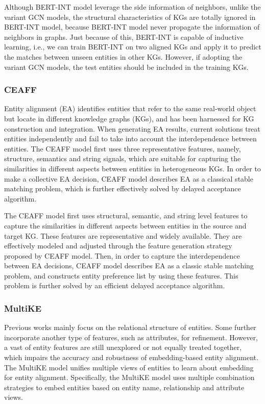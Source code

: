 \documentclass[sigconf]{acmart}
\begin{document}
{Although BERT-INT model leverage the side information of neighbors, unlike the variant GCN models, the structural characteristics of KGs are totally ignored in BERT-INT model, because BERT-INT model never propagate the information of neighbors in graphs. Just because of this, BERT-INT is capable of inductive learning, i.e., we can train BERT-INT on two aligned KGs and apply it to predict the matches between unseen entities in other KGs. However, if adopting the variant GCN models, the test entities should be included in the training KGs.

\subsubsection{CEAFF \cite{zeng2020collective}}

Entity alignment (EA) identifies entities that refer to the same real-world object but locate in different knowledge graphs (KGs), and has been harnessed for KG construction and integration. When generating EA results, current solutions treat entities independently and fail to take into account the interdependence between entities. The CEAFF model first uses three representative features, namely, structure, semantics and string signals, which are suitable for capturing the similarities in different aspects between entities in heterogeneous KGs. In order to make a collective EA decision, CEAFF model describes EA as a classical stable matching problem, which is further effectively solved by delayed acceptance algorithm.

The CEAFF model first uses structural, semantic, and string level features to capture the similarities in different aspects between entities in the source and target KG. These features are representative and widely available. They are effectively modeled and adjusted through the feature generation strategy proposed by CEAFF model. Then, in order to capture the interdependence between EA decisions, CEAFF model describes EA as a classic stable matching problem, and constructs entity preference list by using these features. This problem is further solved by an efficient delayed acceptance algorithm.

\subsubsection{MultiKE \cite{zhang2019multi}}

Previous works mainly focus on the relational structure of entities. Some further incorporate another type of features, such as attributes, for refinement. However, a vast of entity features are still unexplored or not equally treated together, which impairs the accuracy and robustness of embedding-based entity alignment. The MultiKE model unifies multiple views of entities to learn about embedding for entity alignment. Specifically, the MultiKE model uses multiple combination strategies to embed entities based on entity name, relationship and attribute views.

}
\end{document}
